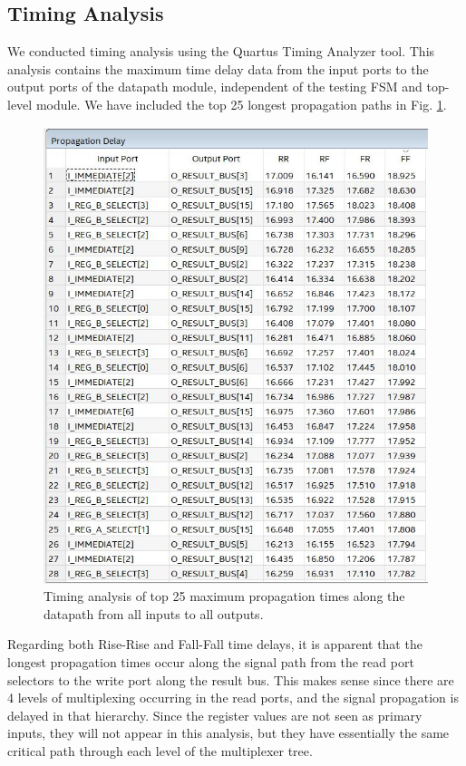 \documentclass[conference]{IEEEtran}
\begin{document}
\subsection{Timing Analysis}
We conducted timing analysis using the Quartus Timing Analyzer tool. This analysis contains the maximum time delay data from the input ports to the output ports of the datapath module, independent of the testing FSM and top-level module. We have included the top 25 longest propagation paths in Fig. \ref{fig:datapath_timing_table}.
\begin{figure}[h]
    \centering
    \includegraphics[scale=0.6]{lab_2_figures/timing_analysis_datapath.JPG}
    \caption{Timing analysis of top 25 maximum propagation times along the datapath from all inputs to all outputs.}
    \label{fig:datapath_timing_table}
\end{figure}
Regarding both Rise-Rise and Fall-Fall time delays, it is apparent that the longest propagation times occur along the signal path from the read port selectors to the write port along the result bus. This makes sense since there are 4 levels of multiplexing occurring in the read ports, and the signal propagation is delayed in that hierarchy. Since the register values are not seen as primary inputs, they will not appear in this analysis, but they have essentially the same critical path through each level of the multiplexer tree.
\end{document}
